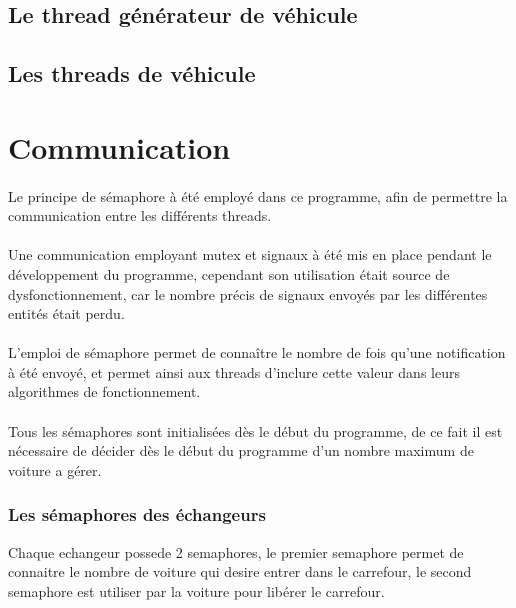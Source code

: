 \documentclass{report}
\begin{document}
	\subsection{Le thread générateur de véhicule}
	
	\subsection{Les threads de véhicule}
	
	
	
	\newpage
	
	\section{Communication}
	\paragraph{}
	Le principe de sémaphore à été employé dans ce programme, afin de permettre la communication entre les différents threads. 
	\paragraph{}
	Une communication employant mutex et signaux à été mis en place pendant le développement du programme, cependant son utilisation était source de dysfonctionnement, car le nombre précis de signaux envoyés par les différentes entités était perdu.
	\paragraph{}
	L'emploi de sémaphore permet de connaître le nombre de fois qu'une notification à été envoyé, et permet ainsi aux threads d'inclure cette valeur dans leurs algorithmes de fonctionnement.
	\paragraph{}
	Tous les sémaphores sont initialisées dès le début du programme, de ce fait il est nécessaire de décider dès le début du programme d'un nombre maximum de voiture a gérer.
	
			\subsubsection{Les sémaphores des échangeurs}
			Chaque echangeur possede 2 semaphores, le premier semaphore permet de connaitre le nombre de voiture qui desire entrer dans le carrefour, le second semaphore est utiliser par la voiture pour libérer le carrefour.
\end{document}
